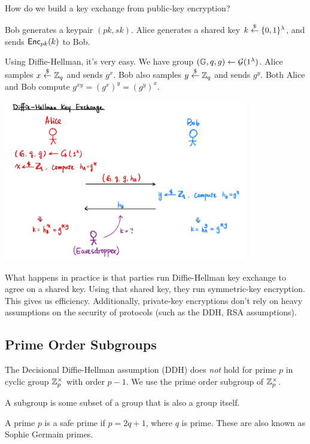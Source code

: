 \begin{ques*}
    How do we build a key exchange from public-key encryption?
\end{ques*}
Bob generates a keypair $(pk, sk)$. Alice generates a shared key $k\overset{\$}{\leftarrow} \{0, 1\}^\lambda$, and sends $\operatorname{\mathsf{Enc}}_{pk}(k)$ to Bob.

Using Diffie-Hellman, it's very easy. We have group $(\mathbb G, q, g)\leftarrow \mathcal{G}(1^\lambda)$. Alice samples $x\overset{\$}{\leftarrow} \mathbb Z_q$ and sends $g^x$. Bob also samples $y\overset{\$}{\leftarrow} \mathbb Z_q$ and sends $g^y$. Both Alice and Bob compute $g^{xy} = (g^x)^y = (g^y)^x$.

\begin{center}
    \includegraphics[width=0.8\textwidth]{images/2023-02-02/diffie-hellman.png}
\end{center}

What happens in practice is that parties run Diffie-Hellman key exchange to agree on a shared key. Using that shared key, they run symmetric-key encryption. This gives us efficiency. Additionally, private-key encryptions don't rely on heavy assumptions on the security of protocols (such as the DDH, RSA assumptions).

\subsection{Prime Order Subgroups}
The Decisional Diffie-Hellman assumption (DDH) does \emph{not} hold for prime $p$ in cyclic group $\mathbb Z_p^\times$ with order $p-1$. We use the prime order subgroup of $\mathbb Z_p^\times$.

\begin{definition}[Subgroup]
    A subgroup is some subset of a group that is also a group itself.
\end{definition}

\begin{definition}
    A prime $p$ is a safe prime if $p = 2q+1$, where $q$ is prime. These are also known as Sophie Germain primes.
\end{definition}

